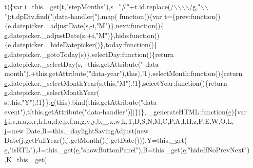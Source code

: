 \begin{DoxyCode}
      \hyperlink{jquery-2_80_83_8min_8js_aaccc9105df5383111407fd5b41255e23}{t})\{var i=this.\_get(t,\textcolor{stringliteral}{"stepMonths"}),s=\textcolor{stringliteral}{"#"}+t.id.replace(/\(\backslash\)\(\backslash\)\(\backslash\)\(\backslash\)/g,\textcolor{stringliteral}{"\(\backslash\)\(\backslash\)"});t.dpDiv.find(\textcolor{stringliteral}{"[data-handler]"}).map(\textcolor{keyword}{
      function}()\{var t=\{prev:\textcolor{keyword}{function}()\{\hyperlink{jquery-ui_8min_8js_a2c038346d47955cbe2cb91e338edd7e1}{e}.datepicker.\_adjustDate(s,-i,\textcolor{stringliteral}{"M"})\},next:\textcolor{keyword}{function}()\{
      \hyperlink{jquery-ui_8min_8js_a2c038346d47955cbe2cb91e338edd7e1}{e}.datepicker.\_adjustDate(s,+i,\textcolor{stringliteral}{"M"})\},hide:\textcolor{keyword}{function}()\{\hyperlink{jquery-ui_8min_8js_a2c038346d47955cbe2cb91e338edd7e1}{e}.datepicker.\_hideDatepicker()\},today:\textcolor{keyword}{function}()\{
      \hyperlink{jquery-ui_8min_8js_a2c038346d47955cbe2cb91e338edd7e1}{e}.datepicker.\_gotoToday(s)\},selectDay:\textcolor{keyword}{function}()\{\textcolor{keywordflow}{return} \hyperlink{jquery-ui_8min_8js_a2c038346d47955cbe2cb91e338edd7e1}{e}.datepicker.\_selectDay(s,+this.getAttribute(\textcolor{stringliteral}{"
      data-month"}),+this.getAttribute(\textcolor{stringliteral}{"data-year"}),\textcolor{keyword}{this}),!1\},selectMonth:\textcolor{keyword}{function}()\{\textcolor{keywordflow}{return} 
      \hyperlink{jquery-ui_8min_8js_a2c038346d47955cbe2cb91e338edd7e1}{e}.datepicker.\_selectMonthYear(s,\textcolor{keyword}{this},\textcolor{stringliteral}{"M"}),!1\},selectYear:\textcolor{keyword}{function}()\{\textcolor{keywordflow}{return} \hyperlink{jquery-ui_8min_8js_a2c038346d47955cbe2cb91e338edd7e1}{e}.datepicker.\_selectMonthYear(
      s,\textcolor{keyword}{this},\textcolor{stringliteral}{"Y"}),!1\}\};\hyperlink{jquery-ui_8min_8js_a2c038346d47955cbe2cb91e338edd7e1}{e}(\textcolor{keyword}{this}).bind(this.getAttribute(\textcolor{stringliteral}{"data-event"}),t[this.getAttribute(\textcolor{stringliteral}{"data-handler"})])\})\},
      \_generateHTML:\textcolor{keyword}{function}(\hyperlink{jquery-ui_8min_8js_a2c038346d47955cbe2cb91e338edd7e1}{e})\{var \hyperlink{jquery-2_80_83_8min_8js_aaccc9105df5383111407fd5b41255e23}{t},i,s,n,a,o,r,h,l,u,d,c,p,f,m,g,v,y,b,\_,x,w,k,T,D,S,N,M,C,P,A,I,H,z,F,E,W,O,L,
      \hyperlink{jquery-2_80_83_8min_8js_a1938114fe22834a3edca375302d03732}{j}=\textcolor{keyword}{new} Date,R=this.\_daylightSavingAdjust(\textcolor{keyword}{new} Date(j.getFullYear(),j.getMonth(),j.getDate())),Y=this.\_get(
      \hyperlink{jquery-ui_8min_8js_a2c038346d47955cbe2cb91e338edd7e1}{e},\textcolor{stringliteral}{"isRTL"}),J=this.\_get(\hyperlink{jquery-ui_8min_8js_a2c038346d47955cbe2cb91e338edd7e1}{e},\textcolor{stringliteral}{"showButtonPanel"}),B=this.\_get(\hyperlink{jquery-ui_8min_8js_a2c038346d47955cbe2cb91e338edd7e1}{e},\textcolor{stringliteral}{"hideIfNoPrevNext"}),K=this.\_get(

\end{DoxyCode}
